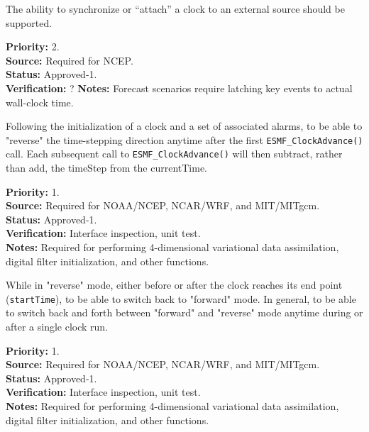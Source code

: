 The ability to synchronize or ``attach'' a clock to an external source should be supported.
\begin{reqlist}
{\bf Priority:} 2.\\
{\bf Source:} Required for NCEP. \\
{\bf Status:} Approved-1. \\
{\bf Verification:} ? 
{\bf Notes:} Forecast scenarios require latching key events to actual wall-clock time. 
\end{reqlist}

Following the initialization of a clock and a set of associated alarms, to be able to "reverse" the time-stepping direction anytime after the first {\tt ESMF\_ClockAdvance()} call.  Each subsequent call to {\tt ESMF\_ClockAdvance()} will then subtract, rather than add, the timeStep from the currentTime.
\begin{reqlist}
{\bf Priority:} 1. \\
{\bf Source:} Required for NOAA/NCEP, NCAR/WRF, and MIT/MITgcm. \\
{\bf Status:} Approved-1. \\
{\bf Verification:} Interface inspection, unit test. \\
{\bf Notes:} Required for performing 4-dimensional variational data assimilation, digital filter initialization, and other functions.
\end{reqlist}

While in "reverse" mode, either before or after the clock reaches its end point ({\tt startTime}), to be able to switch back to "forward" mode.   In general, to be able to switch back and forth between "forward" and "reverse" mode anytime during or after a single clock run.
\begin{reqlist}
{\bf Priority:} 1. \\
{\bf Source:} Required for NOAA/NCEP, NCAR/WRF, and MIT/MITgcm. \\
{\bf Status:} Approved-1. \\
{\bf Verification:} Interface inspection, unit test. \\
{\bf Notes:} Required for performing 4-dimensional variational data assimilation, digital filter initialization, and other functions.
\end{reqlist}

